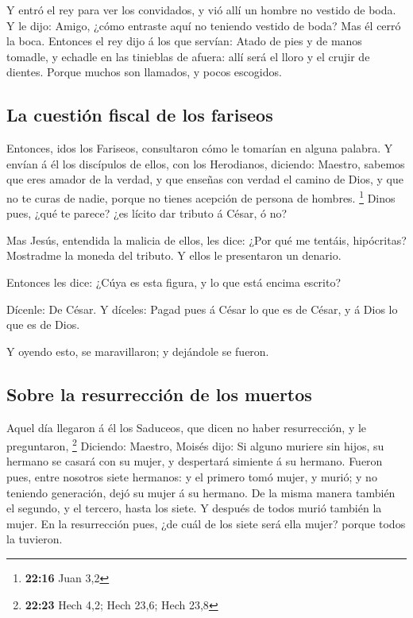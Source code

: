  Y entró el rey para ver los convidados, y vió allí un
hombre no vestido de boda.  Y le dijo: Amigo, ¿cómo
entraste aquí no teniendo vestido de boda? Mas él cerró la boca.
 Entonces el rey dijo á los que servían: Atado de pies y
de manos tomadle, y echadle en las tinieblas de afuera: allí será el
lloro y el crujir de dientes.  Porque muchos son
llamados, y pocos escogidos.

\hypertarget{la-cuestiuxf3n-fiscal-de-los-fariseos}{%
\subsection{La cuestión fiscal de los
fariseos}\label{la-cuestiuxf3n-fiscal-de-los-fariseos}}

 Entonces, idos los Fariseos, consultaron cómo le
tomarían en alguna palabra.  Y envían á él los discípulos
de ellos, con los Herodianos, diciendo: Maestro, sabemos que eres amador
de la verdad, y que enseñas con verdad el camino de Dios, y que no te
curas de nadie, porque no tienes acepción de persona de hombres.
\footnote{\textbf{22:16} Juan 3,2}  Dinos pues, ¿qué te
parece? ¿es lícito dar tributo á César, ó no?

 Mas Jesús, entendida la malicia de ellos, les dice: ¿Por
qué me tentáis, hipócritas?  Mostradme la moneda del
tributo. Y ellos le presentaron un denario.

 Entonces les dice: ¿Cúya es esta figura, y lo que está
encima escrito?

 Dícenle: De César. Y díceles: Pagad pues á César lo que
es de César, y á Dios lo que es de Dios.

 Y oyendo esto, se maravillaron; y dejándole se fueron.

\hypertarget{sobre-la-resurrecciuxf3n-de-los-muertos}{%
\subsection{Sobre la resurrección de los
muertos}\label{sobre-la-resurrecciuxf3n-de-los-muertos}}

 Aquel día llegaron á él los Saduceos, que dicen no haber
resurrección, y le preguntaron, \footnote{\textbf{22:23} Hech 4,2; Hech
  23,6; Hech 23,8}  Diciendo: Maestro, Moisés dijo: Si
alguno muriere sin hijos, su hermano se casará con su mujer, y
despertará simiente á su hermano.  Fueron pues, entre
nosotros siete hermanos: y el primero tomó mujer, y murió; y no teniendo
generación, dejó su mujer á su hermano.  De la misma
manera también el segundo, y el tercero, hasta los siete.
 Y después de todos murió también la mujer.
 En la resurrección pues, ¿de cuál de los siete será ella
mujer? porque todos la tuvieron.

